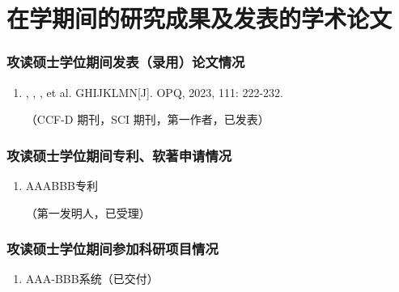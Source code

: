 \chapter{在学期间的研究成果及发表的学术论文}


\subsection*{攻读硕士学位期间发表（录用）论文情况}

\begin{enumerate}
    \item \textbf{}, , , et al. GHIJKLMN[J]. OPQ, 2023, 111: 222-232.
    
    {\hfill（CCF-D 期刊，SCI 期刊，第一作者，已发表）}
\end{enumerate}

\subsection*{攻读硕士学位期间专利、软著申请情况}
\begin{enumerate}
  \item AAABBB专利
  
  {\hfill（第一发明人，已受理）}
\end{enumerate}


\subsection*{攻读硕士学位期间参加科研项目情况}

\begin{enumerate}
  \item AAA-BBB系统（已交付）
\end{enumerate}
